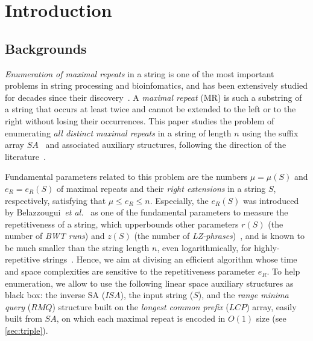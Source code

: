 
\section{Introduction}
\label{sec:intro}
\subsection{Backgrounds}
\textit{Enumeration of maximal repeats} in a string is one of the most important problems in string processing and bioinfomatics, and has been extensively studied for decades since their discovery~\cite{blumer1987complete,crochemore:verin1997compact,raffinot2001maximal}. 
A \textit{maximal repeat} (MR) is such a substring of a string that occurs at least twice and cannot be extended to the left or to the right without losing their occurrences. 
This paper studies the problem of enumerating \textit{all distinct maximal repeats} in a string of length $n$ using the suffix array $SA$~\cite{manber:myers1993suffixarrays} and associated auxiliary structures, following the direction of the literature~\cite{narisawa2007efficient,okanohara2009text,beller:berger2012space:efficient:bbo,belazzougui2020linear,nishimoto:cpm2021enum}.

Fundamental parameters related to this problem are the numbers $\mu = \mu(S)$ and $e_R = e_R(S)$ of maximal repeats and their \textit{right extensions} in a string $S$, respectively, satisfying that $\mu \le e_R\le n$.
Especially, the $e_R(S)$ was introduced by Belazzougui~\textit{et al.}~\cite{belazzougui:cunial:gagie:prezza:raffinot2015composite} as one of the fundamental parameters to measure the repetitiveness of a string, which upperbounds other parameters $r(S)$ (the number of \textit{BWT runs}) and $z(S)$ (the number of \textit{LZ-phrases})~\cite{belazzougui:cunial:gagie:prezza:raffinot2015composite}, and is known to be much smaller than the string length $n$, even logarithmically, for highly-repetitive strings~\cite{radoszewski:rytter2012structure:cdawg:thuemorse}. Hence, we aim at divising an efficient algorithm whose time and space complexities are sensitive to the repetitiveness parameter $e_R$. 
To help enumeration, we allow to use the following linear space auxiliary structures as black box: the inverse SA ($ISA$), the input string ($S$), and the \textit{range minima query} ($RMQ$) structure built on the \textit{longest common prefix} ($LCP$) array, easily built from $SA$, on which each maximal repeat is encoded in $O(1)$ size (see \cref{sec:triple}). 

